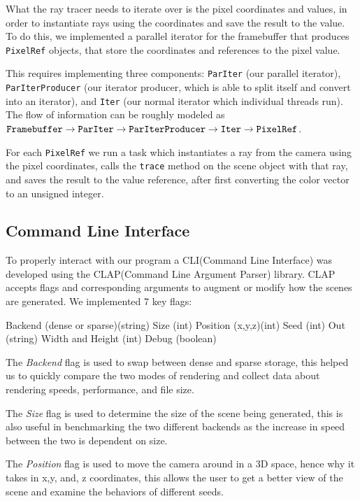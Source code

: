 \documentclass[conference]{IEEEtran}
\begin{document}
What the ray tracer needs to iterate over is the pixel coordinates and values, in order to instantiate rays using the coordinates and save the result to the value.
To do this, we implemented a parallel iterator for the framebuffer that produces \verb|PixelRef| objects, that store the coordinates and references to the pixel value.

This requires implementing three components: \verb|ParIter| (our parallel iterator), \verb|ParIterProducer| (our iterator producer, which is able to split itself and convert into an iterator), and \verb|Iter| (our normal iterator which individual threads run).
The flow of information can be roughly modeled as $\verb|Framebuffer| \to \verb|ParIter| \to \verb|ParIterProducer| \to \verb|Iter| \to \verb|PixelRef|$.

For each \verb|PixelRef| we run a task which instantiates a ray from the camera using the pixel coordinates, calls the \verb|trace| method on the scene object with that ray, and saves the result to the value reference, after first converting the color vector to an unsigned integer.

\subsection{Command Line Interface}

To properly interact with our program a CLI(Command Line Interface) was developed using the CLAP(Command Line Argument Parser) library. CLAP accepts flags and corresponding arguments to augment or modify how the scenes are generated. We implemented 7 key flags: 
\begin{outline}
\1 Backend (dense or sparse)(string)
\1 Size (int)
\1 Position (x,y,z)(int)
\1 Seed (int)
\1 Out (string)
\1 Width and Height (int)
\1 Debug (boolean)
\end{outline}

The \textit{Backend} flag is used to swap between dense and sparse storage, this helped us to quickly compare the two modes of rendering and collect data about rendering speeds, performance, and file size.

The \textit{Size} flag is used to determine the size of the scene being generated, this is also useful in benchmarking the two different backends as the increase in speed between the two is dependent on size.

The \textit{Position} flag is used to move the camera around in a 3D space, hence why it takes in x,y, and, z coordinates, this allows the user to get a better view of the scene and examine the behaviors of different seeds.
\end{document}
